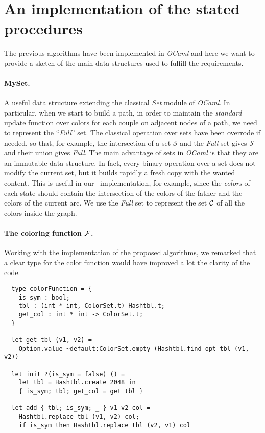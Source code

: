 \section{An implementation of the stated procedures}

The previous algorithms have been implemented in \textit{OCaml} and here we want to provide a sketch of the main data structures used to fulfill the requirements.

\paragraph{MySet.} A useful data structure extending the classical \textit{Set} module of \textit{OCaml}. In particular, when we start to build a path, in order to maintain the \textit{standard} update function over colors for each couple on adjacent nodes of a path, we need to represent the ``\textit{Full}'' set. The classical operation over sets have been overrode if needed, so that, for example, the intersection of a set $\mathcal{S}$ and the \textit{Full} set gives $\mathcal{S}$ and their union gives \textit{Full}. The main advantage of sets in \textit{OCaml} is that they are an immutable data structure. In fact, every binary operation over a set does not modify the current set, but it builds rapidly a fresh copy with the wanted content. This is useful in our \mdd\ implementation, for example, since the \textit{colors} of each state should contain the intersection of the colors of the father and the colors of the current arc. We use the \textit{Full} set to represent the set $\mathcal{C}$ of all the colors inside the graph.

\paragraph{The coloring function $\mathcal{F}$.} Working with the implementation of the proposed algorithms, we remarked that a clear type for the color function would have improved a lot the clarity of the code.

\begin{verbatim}
  type colorFunction = {
    is_sym : bool;
    tbl : (int * int, ColorSet.t) Hashtbl.t;
    get_col : int * int -> ColorSet.t;
  }

  let get tbl (v1, v2) =
    Option.value ~default:ColorSet.empty (Hashtbl.find_opt tbl (v1, v2))

  let init ?(is_sym = false) () =
    let tbl = Hashtbl.create 2048 in
    { is_sym; tbl; get_col = get tbl }

  let add { tbl; is_sym; _ } v1 v2 col =
    Hashtbl.replace tbl (v1, v2) col;
    if is_sym then Hashtbl.replace tbl (v2, v1) col
\end{verbatim}


